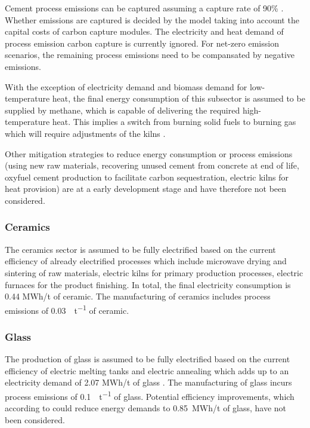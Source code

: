 Cement process emissions can be captured assuming a capture rate of 90\%
\citeS{}. Whether emissions are captured is decided by the model taking into
account the capital costs of carbon capture modules. The electricity and heat
demand of process emission carbon capture is currently ignored. For net-zero
emission scenarios, the remaining process emissions need to be compansated by
negative emissions.

With the exception of electricity demand and biomass demand for low-temperature
heat, the final energy consumption of this subsector is assumed to be supplied
by methane, which is capable of delivering the required high-temperature heat.
This implies a switch from burning solid fuels to burning gas which will require
adjustments of the kilns .

Other mitigation strategies to reduce energy consumption or process emissions
(using new raw materials, recovering unused cement from concrete at end of life,
oxyfuel cement production to facilitate carbon sequestration, electric kilns for
heat provision) are at a early development stage and have therefore not been
considered.



\subsubsection*{Ceramics}

The ceramics sector is assumed to be fully electrified based on the current
efficiency of already electrified processes which include microwave drying and
sintering of raw materials, electric kilns for primary production processes,
electric furnaces for the product finishing. In total, the final electricity
consumption is 0.44 MWh/t of ceramic. The manufacturing of ceramics includes
process emissions of \SI{0.03}{\tco\per\tonne} of ceramic.


\subsubsection*{Glass}

The production of glass is assumed to be fully electrified based on the current
efficiency of electric melting tanks and electric annealing which adds up to an
electricity demand of 2.07 MWh\el/t of glass
. The manufacturing of glass incurs
process emissions of \SI{0.1}{\tco\per\tonne} of glass. Potential efficiency
improvements, which according to 
could reduce energy demands to 0.85~MWh\el/t of glass, have not been considered.

